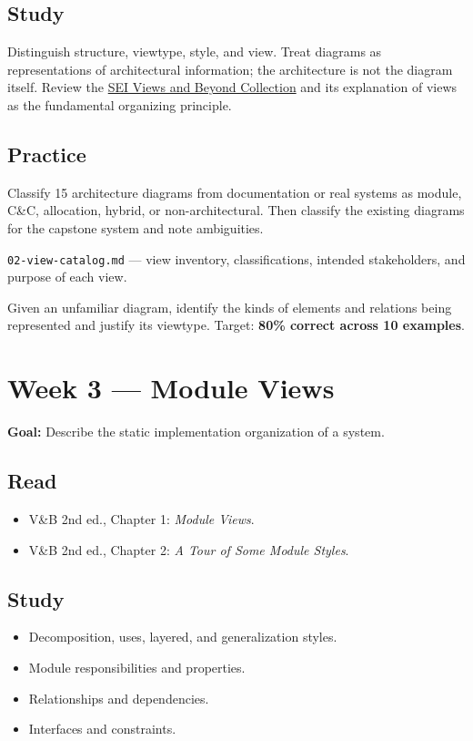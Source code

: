 \documentclass[10pt,letterpaper]{article}
\begin{document}
\subsection{Study}
Distinguish structure, viewtype, style, and view. Treat diagrams as representations of architectural information; the architecture is not the diagram itself. Review the \href{https://www.sei.cmu.edu/library/views-and-beyond-collection/}{SEI Views and Beyond Collection} and its explanation of views as the fundamental organizing principle.

\subsection{Practice}
Classify 15 architecture diagrams from documentation or real systems as module, C\&C, allocation, hybrid, or non-architectural. Then classify the existing diagrams for the capstone system and note ambiguities.

\begin{deliverablebox}
\texttt{02-view-catalog.md} --- view inventory, classifications, intended stakeholders, and purpose of each view.
\end{deliverablebox}

\begin{masterybox}
Given an unfamiliar diagram, identify the kinds of elements and relations being represented and justify its viewtype. Target: \textbf{80\% correct across 10 examples}.
\end{masterybox}

\section{Week 3 --- Module Views}

\textbf{Goal:} Describe the static implementation organization of a system.

\subsection{Read}
\begin{itemize}
  \item V\&B 2nd ed., Chapter 1: \emph{Module Views}.
  \item V\&B 2nd ed., Chapter 2: \emph{A Tour of Some Module Styles}.
\end{itemize}

\subsection{Study}
\begin{itemize}
  \item Decomposition, uses, layered, and generalization styles.
  \item Module responsibilities and properties.
  \item Relationships and dependencies.
  \item Interfaces and constraints.
\end{itemize}
\end{document}
